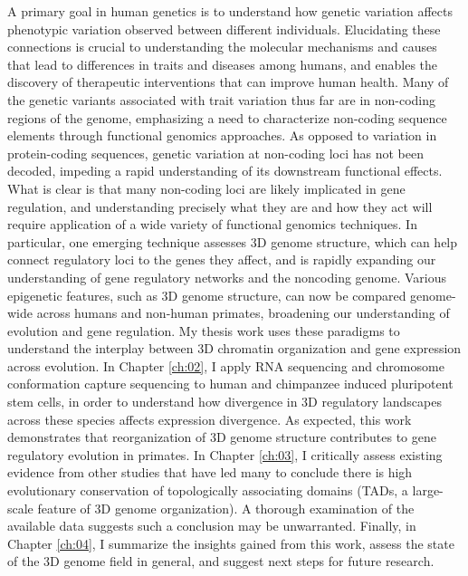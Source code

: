\abstract
A primary goal in human genetics is to understand how genetic variation affects phenotypic variation observed between different individuals.  Elucidating these connections is crucial to understanding the molecular mechanisms and causes that lead to differences in traits and diseases among humans, and enables the discovery of therapeutic interventions that can improve human health. Many of the genetic variants associated with trait variation thus far are in non-coding regions of the genome, emphasizing a need to characterize non-coding sequence elements through functional genomics approaches. As opposed to variation in protein-coding sequences, genetic variation at non-coding loci has not been decoded, impeding a rapid understanding of its downstream functional effects. What is clear is that many non-coding loci are likely implicated in gene regulation, and understanding precisely what they are and how they act will require application of a wide variety of functional genomics techniques. In particular, one emerging technique assesses 3D genome structure, which can help connect regulatory loci to the genes they affect, and is rapidly expanding our understanding of gene regulatory networks and the noncoding genome. Various epigenetic features, such as 3D genome structure, can now be compared genome-wide across humans and non-human primates, broadening our understanding of evolution and gene regulation. My thesis work uses these paradigms to understand the interplay between 3D chromatin organization and gene expression across evolution. In Chapter \ref{ch:02}, I apply RNA sequencing and chromosome conformation capture sequencing to human and chimpanzee induced pluripotent stem cells, in order to understand how divergence in 3D regulatory landscapes across these species affects expression divergence. As expected, this work demonstrates that reorganization of 3D genome structure contributes to gene regulatory evolution in primates. In Chapter \ref{ch:03}, I critically assess existing evidence from other studies that have led many to conclude there is high evolutionary conservation of topologically associating domains (TADs, a large-scale feature of 3D genome organization). A thorough examination of the available data suggests such a conclusion may be unwarranted. Finally, in Chapter \ref{ch:04}, I summarize the insights gained from this work, assess the state of the 3D genome field in general, and suggest next steps for future research.